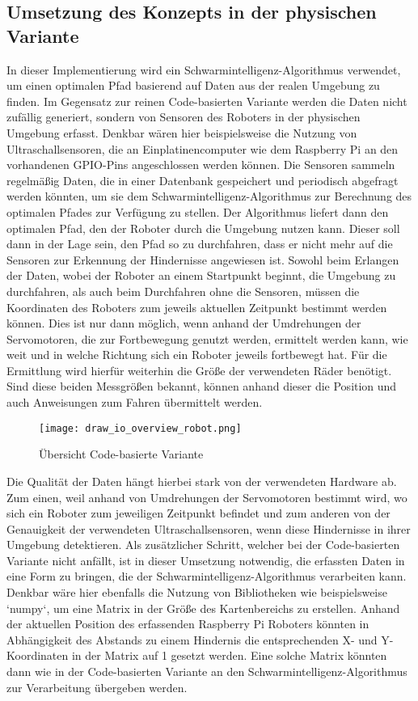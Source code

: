 \subsection{Umsetzung des Konzepts in der physischen Variante}
In dieser Implementierung wird ein Schwarmintelligenz-Algorithmus verwendet, um einen optimalen Pfad basierend auf Daten aus der realen Umgebung zu finden. Im Gegensatz zur reinen Code-basierten Variante werden die Daten nicht zufällig generiert, sondern von Sensoren des Roboters in der physischen Umgebung erfasst. Denkbar wären hier beispielsweise die Nutzung von Ultraschallsensoren, die an Einplatinencomputer wie dem Raspberry Pi an den vorhandenen GPIO-Pins angeschlossen werden können. Die Sensoren sammeln regelmäßig Daten, die in einer Datenbank gespeichert und periodisch abgefragt werden könnten, um sie dem Schwarmintelligenz-Algorithmus zur Berechnung des optimalen Pfades zur Verfügung zu stellen. Der Algorithmus liefert dann den optimalen Pfad, den der Roboter durch die Umgebung nutzen kann. Dieser soll dann in der Lage sein, den Pfad so zu durchfahren, dass er nicht mehr auf die Sensoren zur Erkennung der Hindernisse angewiesen ist. Sowohl beim Erlangen der Daten, wobei der Roboter an einem Startpunkt beginnt, die Umgebung zu durchfahren, als auch beim Durchfahren ohne die Sensoren, müssen die Koordinaten des Roboters zum jeweils aktuellen Zeitpunkt bestimmt werden können. Dies ist nur dann möglich, wenn anhand der Umdrehungen der Servomotoren, die zur Fortbewegung genutzt werden, ermittelt werden kann, wie weit und in welche Richtung sich ein Roboter jeweils fortbewegt hat. Für die Ermittlung wird hierfür weiterhin die Größe der verwendeten Räder benötigt. Sind diese beiden Messgrößen bekannt, können anhand dieser die Position und auch Anweisungen zum Fahren übermittelt werden.
\begin{figure}
    \centering
    \texttt{[image: draw\_io\_overview\_robot.png]}
    \caption{Übersicht Code-basierte Variante}
    \label{fig:Figure_2}
\end{figure}

Die Qualität der Daten hängt hierbei stark von der verwendeten Hardware ab. Zum einen, weil anhand von Umdrehungen der Servomotoren bestimmt wird, wo sich ein Roboter zum jeweiligen Zeitpunkt befindet und zum anderen von der Genauigkeit der verwendeten Ultraschallsensoren, wenn diese Hindernisse in ihrer Umgebung detektieren. Als zusätzlicher Schritt, welcher bei der Code-basierten Variante nicht anfällt, ist in dieser Umsetzung notwendig, die erfassten Daten in eine Form zu bringen, die der Schwarmintelligenz-Algorithmus verarbeiten kann. Denkbar wäre hier ebenfalls die Nutzung von Bibliotheken wie beispielsweise `numpy`, um eine Matrix in der Größe des Kartenbereichs zu erstellen. Anhand der aktuellen Position des erfassenden Raspberry Pi Roboters könnten in Abhängigkeit des Abstands zu einem Hindernis die entsprechenden X- und Y-Koordinaten in der Matrix auf 1 gesetzt werden. Eine solche Matrix könnten dann wie in der Code-basierten Variante an den Schwarmintelligenz-Algorithmus zur Verarbeitung übergeben werden.

